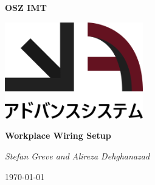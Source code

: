 \documentclass[a4paper]{article}
\newcommand*{\dorg}{OSZ IMT}
\newcommand*{\dauthor}{Stefan Greve and Alireza Dehghanazad}
\newcommand*{\dtitle}{Workplace Wiring Setup}
\begin{document}
\begin{titlepage}
    \centering
    {\scshape\Huge\bfseries{\dorg}\par}
    \par\vspace{1cm}
    \includegraphics[width=0.45\textwidth]{images/logo.png}\par
    \vspace{3cm}
    {\huge\bfseries\dtitle\par}
    \vspace{1cm}
    {\LARGE\itshape\dauthor\par}
    \vspace{1cm}
    {\large\today\par}
    \vfill
    \begin{abstract}
        \lipsum[2-4][12-18]
    \end{abstract}
\end{titlepage}

\newpage

\printnoidxglossary[type=\acronymtype]

\newpage

\tableofcontents
{}

\newpage







\newpage

\medskip
\printbibliography
\end{document}
